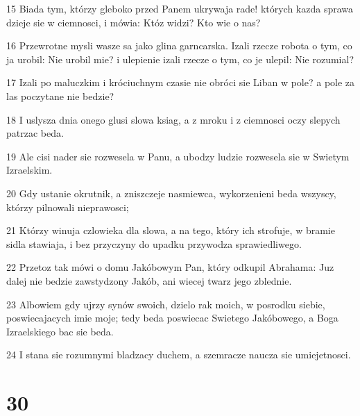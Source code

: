\par 15 Biada tym, którzy gleboko przed Panem ukrywaja rade! których kazda sprawa dzieje sie w ciemnosci, i mówia: Któz widzi? Kto wie o nas?
\par 16 Przewrotne mysli wasze sa jako glina garncarska. Izali rzecze robota o tym, co ja urobil: Nie urobil mie? i ulepienie izali rzecze o tym, co je ulepil: Nie rozumial?
\par 17 Izali po maluczkim i króciuchnym czasie nie obróci sie Liban w pole? a pole za las poczytane nie bedzie?
\par 18 I uslysza dnia onego glusi slowa ksiag, a z mroku i z ciemnosci oczy slepych patrzac beda.
\par 19 Ale cisi nader sie rozwesela w Panu, a ubodzy ludzie rozwesela sie w Swietym Izraelskim.
\par 20 Gdy ustanie okrutnik, a zniszczeje nasmiewca, wykorzenieni beda wszyscy, którzy pilnowali nieprawosci;
\par 21 Którzy winuja czlowieka dla slowa, a na tego, który ich strofuje, w bramie sidla stawiaja, i bez przyczyny do upadku przywodza sprawiedliwego.
\par 22 Przetoz tak mówi o domu Jakóbowym Pan, który odkupil Abrahama: Juz dalej nie bedzie zawstydzony Jakób, ani wiecej twarz jego zblednie.
\par 23 Albowiem gdy ujrzy synów swoich, dzielo rak moich, w posrodku siebie, poswiecajacych imie moje; tedy beda poswiecac Swietego Jakóbowego, a Boga Izraelskiego bac sie beda.
\par 24 I stana sie rozumnymi bladzacy duchem, a szemracze naucza sie umiejetnosci.

\chapter{30}

